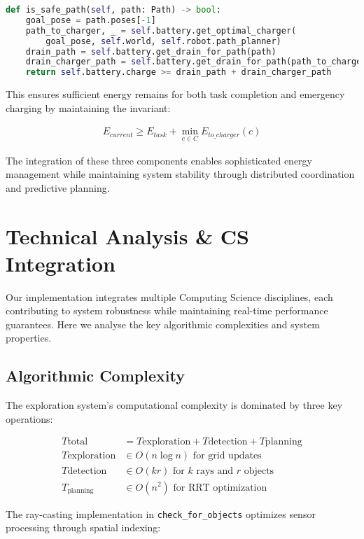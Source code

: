 \documentclass{csfourzero}
\begin{document}
\begin{lstlisting}[language=Python]
def is_safe_path(self, path: Path) -> bool:
    goal_pose = path.poses[-1]
    path_to_charger, _ = self.battery.get_optimal_charger(
        goal_pose, self.world, self.robot.path_planner)
    drain_path = self.battery.get_drain_for_path(path)
    drain_charger_path = self.battery.get_drain_for_path(path_to_charger)
    return self.battery.charge >= drain_path + drain_charger_path
\end{lstlisting}

This ensures sufficient energy remains for both task completion and emergency charging by maintaining the invariant:

\begin{align*}
E_{current} \geq E_{task} + \min_{c \in C} E_{to\_charger}(c)
\end{align*}

The integration of these three components enables sophisticated energy management while maintaining system stability through distributed coordination and predictive planning.


\section{Technical Analysis \& CS Integration}

Our implementation integrates multiple Computing Science disciplines, each contributing to system robustness while maintaining real-time performance guarantees. Here we analyse the key algorithmic complexities and system properties.

\subsection{Algorithmic Complexity}
The exploration system's computational complexity is dominated by three key operations:

\begin{align*}
T{\text{total}} &= T{\text{exploration}} + T{\text{detection}} + T{\text{planning}} \\
T{\text{exploration}} &\in O(n \log n) \text{ for grid updates} \\
T{\text{detection}} &\in O(kr) \text{ for } k \text{ rays and } r \text{ objects} \\
T_{\text{planning}} &\in O(n^2) \text{ for RRT optimization}
\end{align*}

The ray-casting implementation in \texttt{check\_for\_objects} optimizes sensor processing through spatial indexing:
\end{document}
